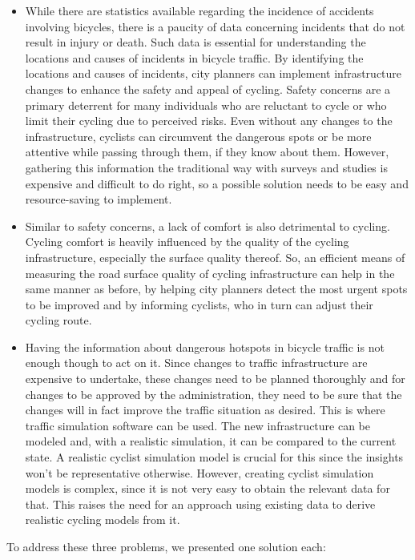 \begin{itemize}
\item While there are statistics available regarding the incidence of accidents involving bicycles, there is a paucity of data concerning incidents that do not result in injury or death.
Such data is essential for understanding the locations and causes of incidents in bicycle traffic.
By identifying the locations and causes of incidents, city planners can implement infrastructure changes to enhance the safety and appeal of cycling.
Safety concerns are a primary deterrent for many individuals who are reluctant to cycle or who limit their cycling due to perceived risks.
Even without any changes to the infrastructure, cyclists can circumvent the dangerous spots or be more attentive while passing through them, if they know about them.
However, gathering this information the traditional way with surveys and studies is expensive and difficult to do right, so a possible solution needs to be easy and resource-saving to implement.
\item Similar to safety concerns, a lack of comfort is also detrimental to cycling.
Cycling comfort is heavily influenced by the quality of the cycling infrastructure, especially the surface quality thereof.
So, an efficient means of measuring the road surface quality of cycling infrastructure can help in the same manner as before, by helping city planners detect the most urgent spots to be improved and by informing cyclists, who in turn can adjust their cycling route.
\item Having the information about dangerous hotspots in bicycle traffic is not enough though to act on it.
Since changes to traffic infrastructure are expensive to undertake, these changes need to be planned thoroughly and for changes to be approved by the administration, they need to be sure that the changes will in fact improve the traffic situation as desired.
This is where traffic simulation software can be used.
The new infrastructure can be modeled and, with a realistic simulation, it can be compared to the current state.
A realistic cyclist simulation model is crucial for this since the insights won't be representative otherwise.
However, creating cyclist simulation models is complex, since it is not very easy to obtain the relevant data for that.
This raises the need for an approach using existing data to derive realistic cycling models from it.
\end{itemize}

To address these three problems, we presented one solution each:


